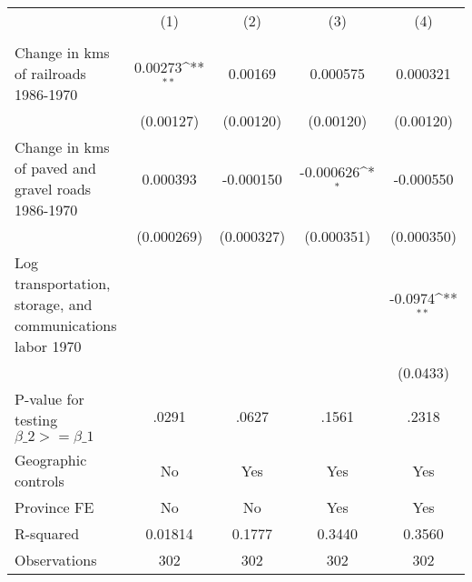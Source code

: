{
\def\sym#1{\ifmmode^{#1}\else\(^{#1}\)\fi}
\begin{tabular}{l*{4}{c}}
\hline\hline
                &\multicolumn{1}{c}{(1)}&\multicolumn{1}{c}{(2)}&\multicolumn{1}{c}{(3)}&\multicolumn{1}{c}{(4)}\\
                &\multicolumn{1}{c}{}&\multicolumn{1}{c}{}&\multicolumn{1}{c}{}&\multicolumn{1}{c}{}\\
\hline
Change in kms of railroads 1986-1970&  0.00273\sym{**} &  0.00169         & 0.000575         & 0.000321         \\
                &(0.00127)         &(0.00120)         &(0.00120)         &(0.00120)         \\
[1em]
Change in kms of paved and gravel roads 1986-1970& 0.000393         &-0.000150         &-0.000626\sym{*}  &-0.000550         \\
                &(0.000269)         &(0.000327)         &(0.000351)         &(0.000350)         \\
[1em]
Log transportation, storage, and communications labor 1970&                  &                  &                  &  -0.0974\sym{**} \\
                &                  &                  &                  & (0.0433)         \\
\hline
P-value for testing $\beta\_{2} >= \beta\_{1}$&    .0291         &    .0627         &    .1561         &    .2318         \\
Geographic controls&       No         &      Yes         &      Yes         &      Yes         \\
Province FE     &       No         &       No         &      Yes         &      Yes         \\
R-squared       &  0.01814         &   0.1777         &   0.3440         &   0.3560         \\
Observations    &      302         &      302         &      302         &      302         \\
\hline\hline
\end{tabular}
}
